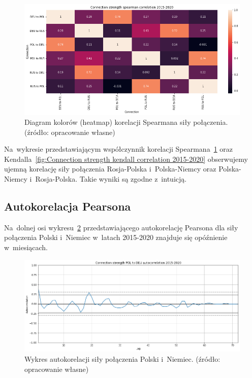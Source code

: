 \documentclass[11pt]{report}
\begin{document}
    \begin{figure}[!ht]
        \centering
        \includegraphics[width=\linewidth]{../spade_proto/figures/correlation/Connection strength spearman correlation 2015-2020.png}
        \caption{Diagram kolorów (heatmap) korelacji Spearmana siły połączenia. (źródło: opracowanie własne)}
        \label{fig:Connection strength spearman correlation 2015-2020}
    \end{figure}

    Na~wykresie przedstawiającym współczynnik korelacji Spearmana~\ref{fig:Connection strength spearman correlation 2015-2020}
    oraz Kendalla~\ref{fig:Connection strength kendall correlation 2015-2020}
    obserwujemy ujemną korelację siły połączenia Rosja-Polska i~Polska-Niemcy oraz Polska-Niemcy i~Rosja-Polska.
    Takie wyniki są zgodne z~intuicją.

    \subsection{Autokorelacja Pearsona}
    Na~dolnej osi wykresu~\ref{fig:connection-strength-pol-to-deu-autocorrelation-2015-2020} przedstawiającego
    autokorelację Pearsona dla siły połączenia Polski i~Niemiec w~latach 2015-2020 znajduje się opóźnienie w~miesiącach.

    \begin{figure}[!ht]
        \centering
        \includegraphics[width=\linewidth]{../spade_proto/figures/autocorrelation/Connection strength POL to DEU autocorrelation 2015-2020.png}
        \caption{Wykres autokorelacji siły połączenia Polski i~Niemiec. (źródło: opracowanie własne)}
        \label{fig:connection-strength-pol-to-deu-autocorrelation-2015-2020}
    \end{figure}
\end{document}
